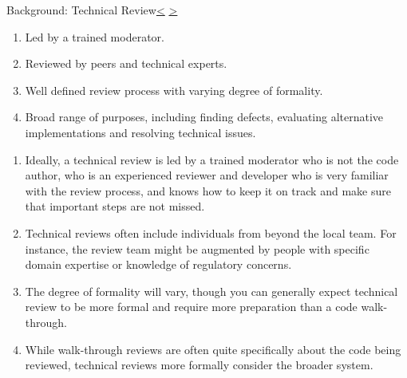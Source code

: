 \documentclass[12pt]{extarticle}
\newenvironment{instructionblock}{\Large\bgroup}{\egroup}
\begin{document}
\pagebreak
\begin{slide}{Background: Technical Review}{\hyperref[slide 14]{\textless} \hyperref[slide 16]{\textgreater}}
	\vskip 10pt
	\begin{instructionblock}
	\begin{enumerate}
	\item Led by a trained moderator\cite{TechnicalReview}.
	\item Reviewed by peers and technical experts\cite{TechnicalReview}.
	\item Well defined review process with varying degree of formality\cite{TechnicalReview}.
	\item Broad range of purposes, including finding defects, evaluating alternative implementations and resolving technical issues\cite{TechnicalReview}.
	\end{enumerate}
	\end{instructionblock}
\end{slide}
\begin{enumerate}
\item Ideally, a technical review is led by a trained moderator who is not the code author, who is an experienced reviewer and developer who is very familiar with the review process, and knows how to keep it on track and make sure that important steps are not missed\cite{TechnicalReview}.
\item Technical reviews often include individuals from beyond the local team. For instance, the review team might be augmented by people with specific domain expertise or knowledge of regulatory concerns\cite{TechnicalReview}.
\item The degree of formality will vary, though you can generally expect technical review to be more formal and require more preparation than a code walk-through\cite{TechnicalReview}.
\item While walk-through reviews are often quite specifically about the code being reviewed, technical reviews more formally consider the broader system\cite{TechnicalReview}.
\end{enumerate}


\end{document}
